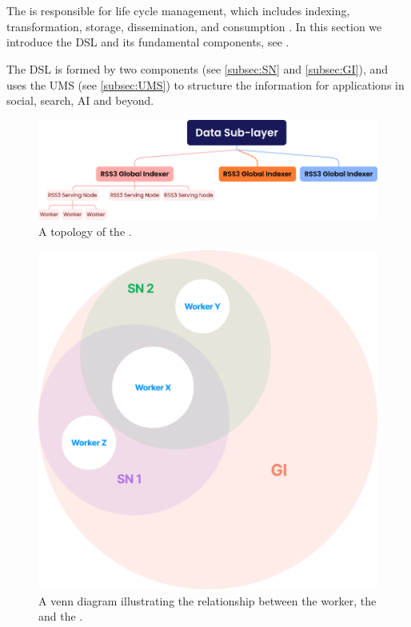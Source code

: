 \section{}
\label{sec:DSL}

The  is responsible for  life cycle management, which includes indexing, transformation, storage, dissemination, and consumption \cite{nationalinstituteofstandardsandtechnology2016Information}.
In this section we introduce the \gls{DSL} and its fundamental components, see .

The \gls{DSL} is formed by two components (see \cref{subsec:SN} and \cref{subsec:GI}), and uses the \gls{UMS} (see \cref{subsec:UMS}) to structure the information for applications in social, search, AI and beyond.

    {
        \begin{figure}[tb!]
            \centering
            \includegraphics[width=\columnwidth]{figures/DSL.png}
            \caption{A topology of the .}
            \label{fig:DSL}
        \end{figure}
    }


    {
        \begin{figure}[tb!]
            \centering
            \includegraphics[width=0.7\columnwidth]{figures/GI.png}
            \caption{A venn diagram illustrating the relationship between the worker, the  and the .}
            \label{fig:GI}
        \end{figure}
    }


